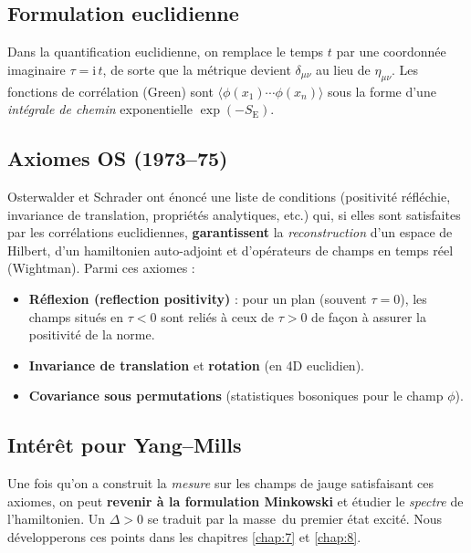 	\subsection*{Formulation euclidienne}
	Dans la quantification euclidienne, on remplace le temps \(t\) par une coordonnée imaginaire \(\tau = \mathrm{i}\,t\), de sorte que la métrique devient \(\delta_{\mu\nu}\) au lieu de \(\eta_{\mu\nu}\). Les fonctions de corrélation (Green) sont \(\langle \phi(x_1)\cdots \phi(x_n)\rangle\) sous la forme d’une \emph{intégrale de chemin} exponentielle \(\exp(-S_{\mathrm{E}})\).
	
	\subsection*{Axiomes OS (1973--75)}
	Osterwalder et Schrader \cite{OsterwalderSchrader1973,OsterwalderSchrader1975} ont énoncé une liste de conditions (positivité réfléchie, invariance de translation, propriétés analytiques, etc.) qui, si elles sont satisfaites par les corrélations euclidiennes, \textbf{garantissent} la \emph{reconstruction} d’un espace de Hilbert, d’un hamiltonien auto-adjoint et d’opérateurs de champs en temps réel (Wightman). Parmi ces axiomes :
	\begin{itemize}
		\item \textbf{Réflexion (reflection positivity)} : pour un plan (souvent \(\tau=0\)), les champs situés en \(\tau<0\) sont reliés à ceux de \(\tau>0\) de façon à assurer la positivité de la norme.
		\item \textbf{Invariance de translation} et \textbf{rotation} (en 4D euclidien).
		\item \textbf{Covariance sous permutations} (statistiques bosoniques pour le champ \(\phi\)).
	\end{itemize}
	
	\subsection*{Intérêt pour Yang--Mills}
	Une fois qu’on a construit la \emph{mesure} sur les champs de jauge satisfaisant ces axiomes, on peut \textbf{revenir à la formulation Minkowski} et étudier le \emph{spectre} de l’hamiltonien. Un \(\Delta>0\) se traduit par la \og masse\fg\ du premier état excité. Nous développerons ces points dans les chapitres \ref{chap:7} et \ref{chap:8}.
	
	\vspace{2em}
	
